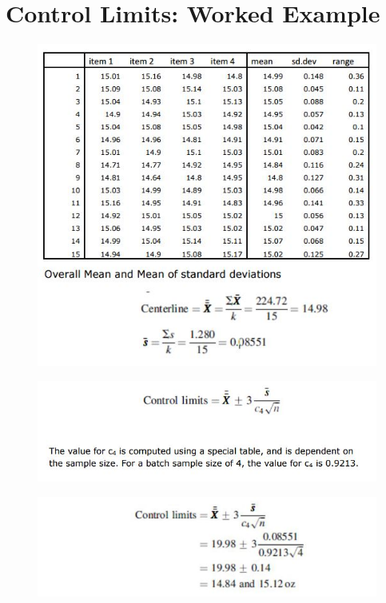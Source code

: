 \documentclass[]{report}
\begin{document}
{\begin{figure}[h!]
\end{figure}
\newpage
\section{Control Limits: Worked Example}
\begin{figure}[h!]
\centering
\includegraphics[width=1\linewidth]{images/WorkedExample1-data}
\end{figure}
\newpage
\begin{figure}[h!]
\centering
\includegraphics[width=1\linewidth]{images/WorkedExample1-formula}
\end{figure}
\begin{figure}[h!]
	\centering
	\includegraphics[width=1\linewidth]{images/WorkedExample1-solution}

\end{figure}}
\end{document}
